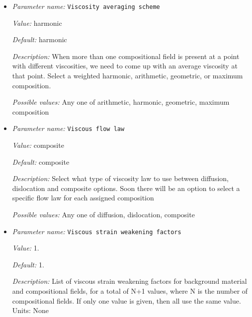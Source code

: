\begin{itemize}
{\it Default:} false


{\it Description:} Apply strain weakening to viscosity, cohesion and internal angle of friction based on accumulated finite strain.  Units: None


{\it Possible values:} A boolean value (true or false)
\item {\it Parameter name:} {\tt Viscosity averaging scheme}
\label{parameters:Material model/Visco Plastic/Viscosity averaging scheme}


{\it Value:} harmonic


{\it Default:} harmonic


{\it Description:} When more than one compositional field is present at a point with different viscosities, we need to come up with an average viscosity at that point.  Select a weighted harmonic, arithmetic, geometric, or maximum composition.


{\it Possible values:} Any one of arithmetic, harmonic, geometric, maximum composition
\item {\it Parameter name:} {\tt Viscous flow law}
\label{parameters:Material model/Visco Plastic/Viscous flow law}


{\it Value:} composite


{\it Default:} composite


{\it Description:} Select what type of viscosity law to use between diffusion, dislocation and composite options. Soon there will be an option to select a specific flow law for each assigned composition 


{\it Possible values:} Any one of diffusion, dislocation, composite
\item {\it Parameter name:} {\tt Viscous strain weakening factors}
\label{parameters:Material model/Visco Plastic/Viscous strain weakening factors}


{\it Value:} 1.


{\it Default:} 1.


{\it Description:} List of viscous strain weakening factors for background material and compositional fields, for a total of N+1 values, where N is the number of compositional fields. If only one value is given, then all use the same value.  Units: None



\end{itemize}
